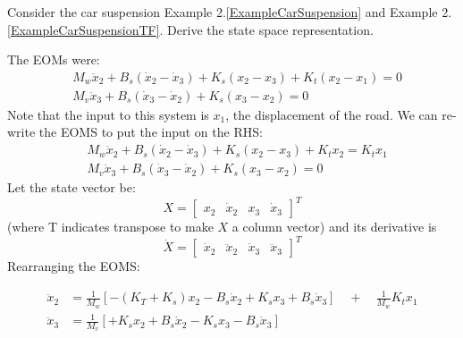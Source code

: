 \begin{Example}\label{suspensionstatespace}
Consider the car suspension
Example 2.\ref{ExampleCarSuspension} and Example 2.\ref{ExampleCarSuspensionTF}.
\vspace{0.2in}
Derive the state space representation.

The EOMs were:
\begin{align*}
&M_w\ddot{x}_2+B_s(\dot{x}_2-\dot{x}_3)+K_s(x_2-x_3)+K_t(x_2-x_1) =0 \\
&M_v\ddot{x}_3+B_s(\dot{x}_3-\dot{x}_2)+K_s(x_3-x_2) = 0
\end{align*}
Note that the input to this system is $x_1$, the displacement of the road.  We  can
re-write the EOMS to put the input on the RHS:
\begin{align*}
&M_w\ddot{x}_2+B_s(\dot{x}_2-\dot{x}_3)+K_s(x_2-x_3)+K_tx_2 = K_tx_1 \\
&M_v\ddot{x}_3+B_s(\dot{x}_3-\dot{x}_2)+K_s(x_3-x_2) = 0
\end{align*}
Let the state vector be:
\[
X = \begin{bmatrix}x_2 & \dot{x}_2 & x_3 & \dot{x}_3\end{bmatrix}^T
\]
(where T indicates transpose to make $X$ a column vector)
and its derivative is
\[
\dot{X} = \begin{bmatrix}\dot{x}_2 & \ddot{x}_2 & \dot{x}_3 & \ddot{x}_3\end{bmatrix}^T
\]
Rearranging the EOMS:

\begin{align*}
\ddot{x}_2  &= \frac{1}{M_w}\left [-(K_T+K_s)x_2-B_s\dot{x}_2+K_sx_3+B_s\dot{x}_3\right]\quad+\quad \frac{1}{M_w}K_tx_1 \\
\ddot{x}_3 &= \frac{1}{M_v}\left[+K_sx_2+B_s\dot{x}_2 -K_sx_3-B_s\dot{x}_3\right]
\end{align*}


\end{Example}
